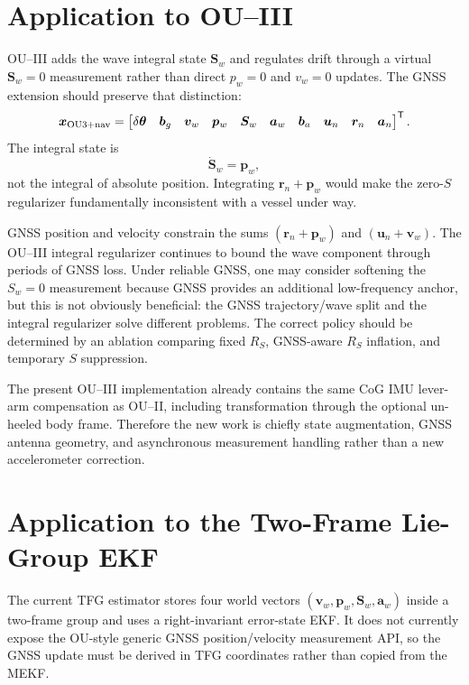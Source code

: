 \documentclass[conference]{IEEEtran}
\DeclareRobustCommand{\vct}[1]{\bm{#1}}
\newcommand{\T}{^{\mathsf T}}
\begin{document}
\section{Application to OU--III}
\label{sec:ou3}

OU--III adds the wave integral state $\vct S_w$ and regulates drift through a virtual
$\vct S_w=0$ measurement rather than direct $p_w=0$ and $v_w=0$ updates.  The GNSS
extension should preserve that distinction:
\begin{equation}
\vct x_{\rm OU3+nav}=
\begin{bmatrix}
\delta\vct\theta & \vct b_g &
\vct v_w & \vct p_w & \vct S_w & \vct a_w & \vct b_a &
\vct u_n & \vct r_n & \vct a_n
\end{bmatrix}\T.
\label{eq:ou3-augmented}
\end{equation}
The integral state is
\begin{equation}
\dot{\vct S}_w=\vct p_w,
\label{eq:sw-wave-only}
\end{equation}
not the integral of absolute position.  Integrating $\vct r_n+\vct p_w$ would make the
zero-$S$ regularizer fundamentally inconsistent with a vessel under way.

GNSS position and velocity constrain the sums
$(\vct r_n+\vct p_w)$ and $(\vct u_n+\vct v_w)$.  The OU--III integral regularizer
continues to bound the wave component through periods of GNSS loss.  Under reliable
GNSS, one may consider softening the $S_w=0$ measurement because GNSS provides an
additional low-frequency anchor, but this is not obviously beneficial: the GNSS
trajectory/wave split and the integral regularizer solve different problems.  The
correct policy should be determined by an ablation comparing fixed $R_S$, GNSS-aware
$R_S$ inflation, and temporary $S$ suppression.

The present OU--III implementation already contains the same CoG IMU lever-arm
compensation as OU--II, including transformation through the optional un-heeled body
frame.  Therefore the new work is chiefly state augmentation, GNSS antenna geometry,
and asynchronous measurement handling rather than a new accelerometer correction.

\section{Application to the Two-Frame Lie-Group EKF}
\label{sec:tfg}

The current TFG estimator stores four world vectors
$(\vct v_w,\vct p_w,\vct S_w,\vct a_w)$ inside a two-frame group and uses a
right-invariant error-state EKF.  It does not currently expose the OU-style generic
GNSS position/velocity measurement API, so the GNSS update must be derived in TFG
coordinates rather than copied from the MEKF.
\end{document}

